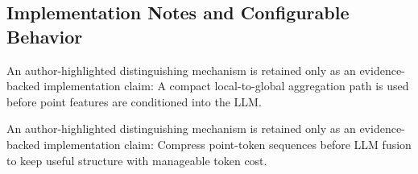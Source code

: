 \subsection{Implementation Notes and Configurable Behavior}
An author-highlighted distinguishing mechanism is retained only as an evidence-backed implementation claim: A compact local-to-global aggregation path is used before point features are conditioned into the LLM.

An author-highlighted distinguishing mechanism is retained only as an evidence-backed implementation claim: Compress point-token sequences before LLM fusion to keep useful structure with manageable token cost.
